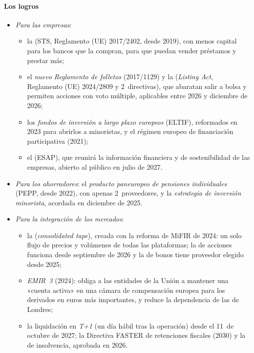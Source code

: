\documentclass[11pt]{article}
\begin{document}
\paragraph{Los logros}

\begin{itemize}
\item \emph{Para las empresas}:
  \begin{itemize}
  \item la  (STS, Reglamento (UE) 2017/2402, desde 2019), con menos capital para los bancos que la compran, para que puedan vender préstamos y prestar más\nocite{UE2017Titulizacion};
  \item el \emph{nuevo Reglamento de folletos} (2017/1129) y la  (\emph{Listing Act}, Reglamento (UE) 2024/2809 y 2~directivas), que abaratan salir a bolsa y permiten acciones con voto múltiple, aplicables entre 2026 y diciembre de 2026\nocite{UE2024Listing};
  \item los \emph{fondos de inversión a largo plazo europeos} (ELTIF), reformados en 2023 para abrirlos a minoristas\nocite{UE2023ELTIF}, y el régimen europeo de financiación participativa (2021);
  \item el  (ESAP), que reunirá la información financiera y de sostenibilidad de las empresas, abierto al público en julio de 2027\nocite{AEVM2026ESAP}.
  \end{itemize}
\item \emph{Para los ahorradores}: el \emph{producto paneuropeo de pensiones individuales} (PEPP, desde 2022), con apenas 2~proveedores\nocite{UE2019PEPP}, y la \emph{estrategia de inversión minorista}, acordada en diciembre de 2025\nocite{Consejo2025InversionMinorista}.
\item \emph{Para la integración de los mercados}:
  \begin{itemize}
  \item la  (\emph{consolidated tape}), creada con la reforma de MiFIR de 2024: un solo flujo de precios y volúmenes de todas las plataformas; la de acciones funciona desde septiembre de 2026 y la de bonos tiene proveedor elegido desde 2025\nocite{AEVM2026CintaConsolidada};
  \item \emph{EMIR~3} (2024): obliga a las entidades de la Unión a mantener una «cuenta activa» en una cámara de compensación europea para los derivados en euros más importantes, y reduce la dependencia de las de Londres\nocite{UE2024EMIR3};
  \item la liquidación en \emph{T+1} (un día hábil tras la operación) desde el 11~de octubre de 2027\nocite{Consejo2025T1}; la Directiva FASTER de retenciones fiscales (2030) y la de insolvencia, aprobada en 2026\nocite{UE2026Insolvencia}.
  \end{itemize}
\end{itemize}
\end{document}
